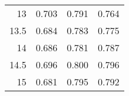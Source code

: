 \begin{table}[]
\begin{tabular}{rccc}
13   & \cellcolor[HTML]{F9A5A7}0.703 & \cellcolor[HTML]{C9E8D3}0.791 & \cellcolor[HTML]{D8EEE0}0.764 \\
13.5 & \cellcolor[HTML]{F87173}0.684 & \cellcolor[HTML]{EBF6F1}0.783 & \cellcolor[HTML]{B0DDBD}0.775 \\
14   & \cellcolor[HTML]{F87678}0.686 & \cellcolor[HTML]{F4F9F8}0.781 & \cellcolor[HTML]{84CC98}0.787 \\
14.5 & \cellcolor[HTML]{F99294}0.696 & \cellcolor[HTML]{A3D8B2}0.800 & \cellcolor[HTML]{63BE7B}0.796 \\
15   & \cellcolor[HTML]{F8696B}0.681 & \cellcolor[HTML]{B8E1C5}0.795 & \cellcolor[HTML]{72C488}0.792 \\ \bottomrule
\end{tabular}
\end{table}